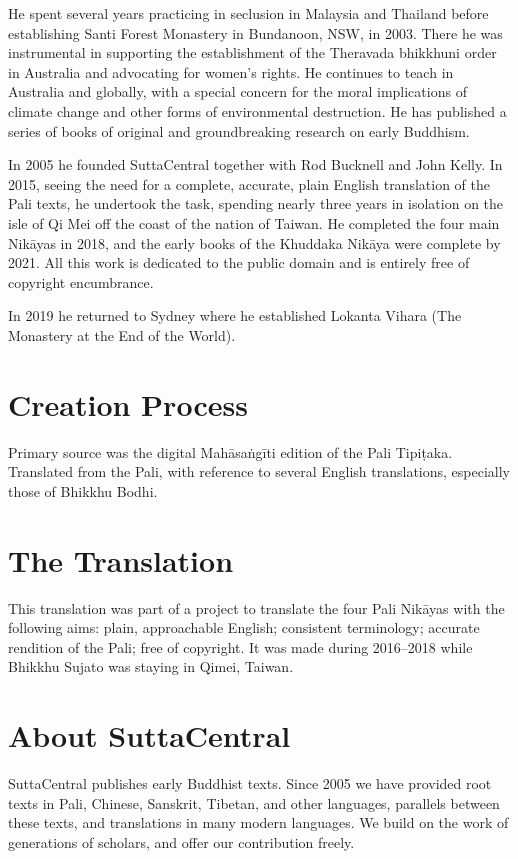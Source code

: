 \documentclass[12pt,openany]{book}%
\begin{document}
He spent several years practicing in seclusion in Malaysia and Thailand before establishing Santi Forest Monastery in Bundanoon, NSW, in 2003. There he was instrumental in supporting the establishment of the Theravada bhikkhuni order in Australia and advocating for women’s rights. He continues to teach in Australia and globally, with a special concern for the moral implications of climate change and other forms of environmental destruction. He has published a series of books of original and groundbreaking research on early Buddhism. 

In 2005 he founded SuttaCentral together with Rod Bucknell and John Kelly. In 2015, seeing the need for a complete, accurate, plain English translation of the Pali texts, he undertook the task, spending nearly three years in isolation on the isle of Qi Mei off the coast of the nation of Taiwan. He completed the four main \textsanskrit{Nikāyas} in 2018, and the early books of the Khuddaka \textsanskrit{Nikāya} were complete by 2021. All this work is dedicated to the public domain and is entirely free of copyright encumbrance. 

In 2019 he returned to Sydney where he established Lokanta Vihara (The Monastery at the End of the World). 

\section*{Creation Process}

Primary source was the digital \textsanskrit{Mahāsaṅgīti} edition of the Pali \textsanskrit{Tipiṭaka}. Translated from the Pali, with reference to several English translations, especially those of Bhikkhu Bodhi.

\section*{The Translation}

This translation was part of a project to translate the four Pali \textsanskrit{Nikāyas} with the following aims: plain, approachable English; consistent terminology; accurate rendition of the Pali; free of copyright. It was made during 2016–2018 while Bhikkhu Sujato was staying in Qimei, Taiwan.

\section*{About SuttaCentral}

SuttaCentral publishes early Buddhist texts. Since 2005 we have provided root texts in Pali, Chinese, Sanskrit, Tibetan, and other languages, parallels between these texts, and translations in many modern languages. We build on the work of generations of scholars, and offer our contribution freely.
\end{document}
